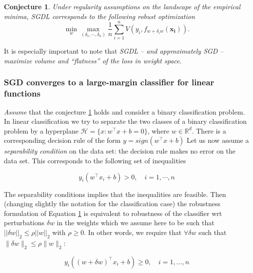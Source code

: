 \documentclass[10pt]{article}
\newtheorem{conjecture}{Conjecture}
\begin{document}
\begin{conjecture}
  Under regularity assumptions on the landscape of the empirical
  minima, SGDL corresponds to the following robust optimization
\begin{equation}
\min_{w} \max_{(\delta_1,\cdots,\delta_n)} \frac{1}{n}\sum_{i=1}^n V(y_i,
f_{w+\delta_i w}(\mathbf{x_i})).
\end{equation}
\label{FlatnessSGDL-1}
\end{conjecture}

It is especially important to note that {\it SGDL -- and approximately
  SGD -- maximize volume and ``flatness'' of the loss in weight
  space}.





\subsubsection{SGD  converges
  to a large-margin classifier for linear functions}


{\it Assume} that the conjecture \ref{FlatnessSGDL-1} holds and
consider a binary classification problem. In linear classification we try to separate the two classes of a
binary classification problem by a hyperplane $\mathcal{H}=\{x :
w^\intercal x +b =0 \}$, where $w \in \mathbb{R}^d$. There is a
corresponding decision rule of the form $y =sign (w^\intercal x +b)$
Let us now assume a  {\it separability condition} on the data set: the decision rule
makes no error on the data set. This corresponds to the following set
of inequalities

\begin{equation}
y_i(w^\intercal x_i + b) > 0, \quad i=1, \cdots,n
\label{linearhyperplane}
\end{equation}

The separability conditions implies that  the inequalities are feasible.
Then (changing slightly the notation for the classification case)  the
robustness formulation of Equation \ref{FlatnessSGDL-1} is equivalent
to robustness of the classifier wrt perturbations $\delta w$ in the weights which we assume here to be
such that $||\delta w||_2 \leq \rho ||w||_2$ with $\rho \geq
0$. In other words, we require that $\forall \delta w$ such that $\|\delta w\|_2 \leq \rho \|w\|_2$:

\begin{equation}
 y_i ((w + \delta w)^\intercal x_i + b ) \geq 0, \quad i=1,\ldots,n
\end{equation}
\end{document}
